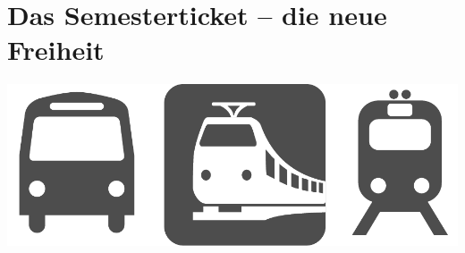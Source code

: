 \section{Das Semesterticket -- die neue Freiheit}

\begin{center}
	\includegraphics[width=\textwidth, height=0.2\textheight]{res/bus_und_bahn.pdf}
\end{center}
